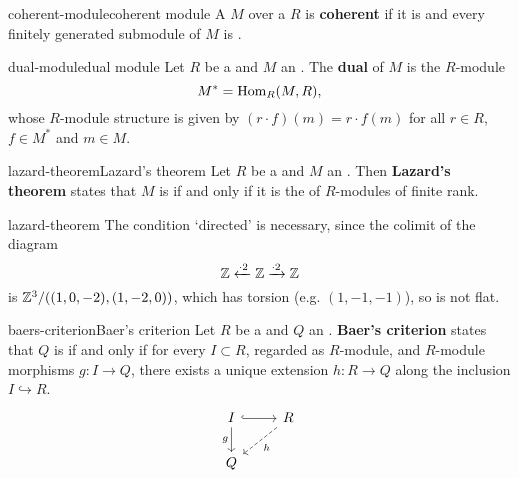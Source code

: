 \begin{topic}{coherent-module}{coherent module}
    A  $M$ over a  $R$ is \textbf{coherent} if it is  and every finitely generated submodule of $M$ is .
\end{topic}

\begin{topic}{dual-module}{dual module}
    Let $R$ be a  and $M$ an . The \textbf{dual} of $M$ is the $R$-module
    \[ M^* = \operatorname{Hom}_R(M, R) , \]
    whose $R$-module structure is given by $(r \cdot f)(m) = r \cdot f(m)$ for all $r \in R$, $f \in M^*$ and $m \in M$.
\end{topic}

\begin{topic}{lazard-theorem}{Lazard's theorem}
    Let $R$ be a  and $M$ an . Then \textbf{Lazard's theorem} states that $M$ is  if and only if it is the  of  $R$-modules of finite rank.
\end{topic}

\begin{example}{lazard-theorem}
    The condition `directed' is necessary, since the colimit of the diagram
    \[ \mathbb{Z} \xleftarrow{\cdot 2} \mathbb{Z} \xrightarrow{\cdot 2} \mathbb{Z} \]
    is $\mathbb{Z}^3 / ((1, 0, -2), (1, -2, 0))$, which has torsion (e.g. $(1, -1, -1)$), so is not flat.
\end{example}

\begin{topic}{baers-criterion}{Baer's criterion}
    Let $R$ be a  and $Q$ an . \textbf{Baer's criterion} states that $Q$ is  if and only if for every  $I \subset R$, regarded as $R$-module, and $R$-module morphisms $g : I \to Q$, there exists a unique extension $h : R \to Q$ along the inclusion $I \hookrightarrow R$.
    \[ \begin{tikzcd} I \arrow[hook]{r} \arrow[swap]{d}{g} & R \arrow[dashed]{dl}{h} \\ Q \end{tikzcd} \]
\end{topic}

